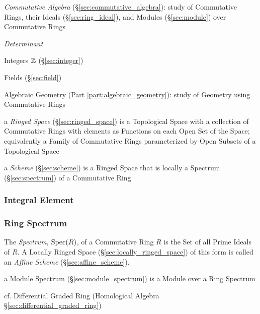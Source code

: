 \fist \emph{Commutative Algebra} (\S\ref{sec:commutative_algebra}): study of
Commutative Rings, their Ideals (\S\ref{sec:ring_ideal}), and Modules
(\S\ref{sec:module}) over Commutative Rings

\emph{Determinant}

Integers $\mathbb{Z}$ (\S\ref{sec:integer})

Fields (\S\ref{sec:field})

Algebraic Geometry (Part \ref{part:algebraic_geometry}): study of
Geometry using Commutative Rings

\fist a \emph{Ringed Space} (\S\ref{sec:ringed_space}) is a Topological Space
with a collection of Commutative Rings with elements as Functions on each Open
Set of the Space; equivalently a Family of Commutative Rings parameterized by
Open Subsets of a Topological Space

\fist a \emph{Scheme} (\S\ref{sec:scheme}) is a Ringed Space that is locally a
Spectrum (\S\ref{sec:spectrum}) of a Commutative Ring



\subsubsection{Integral Element}\label{sec:integral_element}

\subsubsection{Ring Spectrum}\label{sec:ring_spectrum}

The \emph{Spectrum}, $\mathrm{Spec}(R)$, of a Commutative Ring $R$ is the Set of all
Prime Ideals of $R$. A Locally Ringed Space (\S\ref{sec:locally_ringed_space})
of this form is called an \emph{Affine Scheme} (\S\ref{sec:affine_scheme}).

a Module Spectrum (\S\ref{sec:module_spectrum}) is a Module over a Ring Spectrum

cf. Differential Graded Ring (Homological Algebra
\S\ref{sec:differential_graded_ring})

